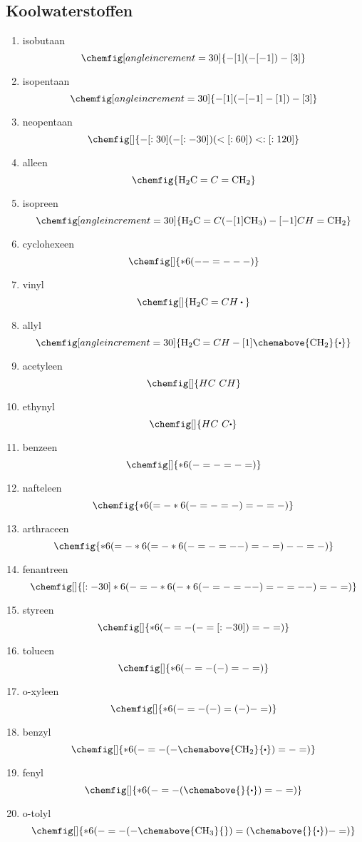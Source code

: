 \documentclass[a4paper,12pt]{article}
\begin{document}
    \maketitle
    \subsection{Koolwaterstoffen}
    \begin{enumerate}
        \item isobutaan $$\chemfig[angle increment=30]{-[1](-[-1])-[3]}$$
        \item isopentaan $$\chemfig[angle increment=30]{-[1](-[-1]-[1])-[3]}$$
        \item neopentaan $$\chemfig[]{-[:30](-[:-30])(<[:60])<:[:120]}$$
        \item alleen $$\chemfig{\ce{H2C}=C=\ce{CH2}}$$
        \item isopreen $$\chemfig[angle increment=30]{\ce{H2C}=C(-[1]\ce{CH3})-[-1]CH=\ce{CH2}}$$
        \item cyclohexeen $$\chemfig[]{*6(--=---)}$$
        \item vinyl $$\chemfig[]{\ce{H2C}=CH\bigcdot{}}$$
        \item allyl $$\chemfig[angle increment=30]{\ce{H2C}=CH-[1]\chemabove{\ce{CH2}}{\bigcdot}}$$
        \item acetyleen $$\chemfig[]{HC~CH}$$
        \item ethynyl $$\chemfig[]{HC~C\bigcdot}$$
        \item benzeen $$\chemfig[]{*6(-=-=-=)}$$
        \item nafteleen $$\chemfig{*6(=-*6(-=-=-)=-=-)}$$
        \item arthraceen $$\chemfig{*6(=-*6(=-*6(-=-=--)=-=)--=-)}$$
        \item fenantreen $$\chemfig[]{[:-30]*6(-=-*6(-*6(-=-=--)=-=--)=-=)}$$
        \item styreen $$\chemfig[]{*6(-=-(-=[:-30])=-=)}$$
        \item tolueen $$\chemfig[]{*6(-=-(-)=-=)}$$
        \item o-xyleen $$\chemfig[]{*6(-=-(-)=(-)-=)}$$
        \item benzyl $$\chemfig[]{*6(-=-(-\chemabove{\ce{CH2}}{\bigcdot{}})=-=)}$$
        \item fenyl $$\chemfig[]{*6(-=-(\chemabove{}{\bigcdot{}})=-=)}$$
        \item o-tolyl $$\chemfig[]{*6(-=-(-\chemabove{\ce{CH3}}{})=(\chemabove{}{\bigcdot{}})-=)}$$
    \end{enumerate}
\end{document}
